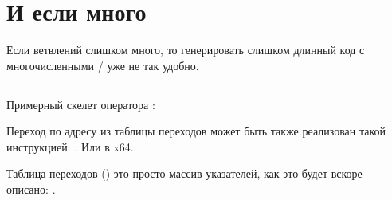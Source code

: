 \section{И если много}

Если ветвлений слишком много, то генерировать слишком длинный код с многочисленными \JE/\JNE 
уже не так удобно.







\subsection{\Conclusion{}}

Примерный скелет оператора :



Переход по адресу из таблицы переходов может быть также реализован такой инструкцией: .
Или  в x64.

Таблица переходов () это просто массив указателей, как это будет вскоре описано: .
